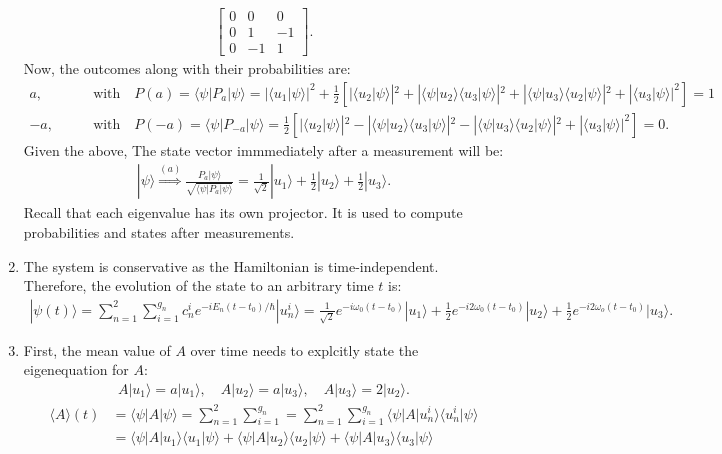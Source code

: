 \documentclass[letterpaper,11pt,twoside]{article}
\newcommand{\ket}[1]{|#1\rangle}
\newcommand{\braket}[1]{\langle#1\rangle}
\begin{document}
\begin{enumerate}[itemsep=0pt,topsep=0pt,label=\alph*.]
\begin{align*}
\begin{bmatrix}
      0&0&0\\0&1&-1\\0&-1&1
    \end{bmatrix}.
  \end{align*}
  Now, the outcomes along with their probabilities are:
  {\small
  \begin{align*}
    a,&\qquad\text{with}\quad P(a)=\braket{\psi|P_a|\psi}=|\braket{u_1|\psi}|^2+\frac{1}{2}\left[|\braket{u_2|\psi}|^2+|\braket{\psi|u_2}\braket{u_3|\psi}|^2+|\braket{\psi|u_3}\braket{u_2|\psi}|^2+|\braket{u_3|\psi}|^2\right]=1\\
    -a,&\qquad\text{with}\quad P(-a)=\braket{\psi|P_{-a}|\psi}=\frac{1}{2}\left[|\braket{u_2|\psi}|^2-|\braket{\psi|u_2}\braket{u_3|\psi}|^2-|\braket{\psi|u_3}\braket{u_2|\psi}|^2+|\braket{u_3|\psi}|^2\right]=0.
  \end{align*}}
  Given the above, The state vector immmediately after a measurement will be:
  \begin{align*}
    \ket{\psi}\stackrel{(a)}{\Longrightarrow}\frac{P_a\ket{\psi}}{\sqrt{\braket{\psi|P_a|\psi}}}=\frac{1}{\sqrt{2}}\ket{u_1}+\frac{1}{2}\ket{u_2}+\frac{1}{2}\ket{u_3}.
  \end{align*}
  Recall that each eigenvalue has its own projector. It is used to compute probabilities and states after measurements.
  \item The system is conservative as the Hamiltonian is time-independent. Therefore, the evolution of the state to an arbitrary time $t$ is:
  \begin{align*}
    \ket{\psi(t)}=\sum_{n=1}^2\sum_{i=1}^{g_n}c_{n}^ie^{-iE_n(t-t_0)/\hbar}\ket{u_n^i}=\frac{1}{\sqrt{2}}e^{-i\omega_0(t-t_0)}\ket{u_1}+\frac{1}{2}e^{-i2\omega_0(t-t_0)}\ket{u_2}+\frac{1}{2}e^{-i2\omega_o(t-t_0)}\ket{u_3}.
  \end{align*}
  \item First, the mean value of $A$ over time needs to explcitly state the eigenequation for $A$:
  \begin{align*}
    A\ket{u_1}=a\ket{u_1},\quad A\ket{u_2}=a\ket{u_3},\quad A\ket{u_3}=2\ket{u_2}.
  \end{align*}
  \begin{align*}
    \braket{A}(t)&=\braket{\psi|A|\psi}=\sum_{n=1}^2\sum_{i=1}^{g_n}=\sum_{n=1}^2\sum_{i=1}^{g_n}\braket{\psi|A|u_n^i}\braket{u_n^i|\psi}\\
    &=\braket{\psi|A|u_1}\braket{u_1|\psi}+\braket{\psi|A|u_2}\braket{u_2|\psi}+\braket{\psi|A|u_3}\braket{u_3|\psi}\\

\end{align*}
\end{enumerate}
\end{document}
